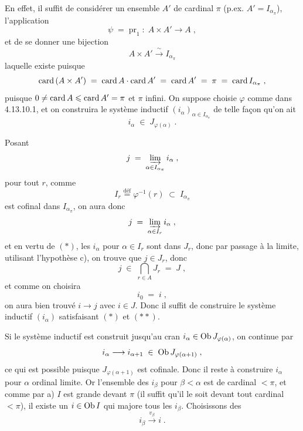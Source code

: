 En effet, il suffit de considérer un ensemble $A'$ de cardinal $\pi$ (p.ex. $A'=I_{\alpha_\pi}$), l'application
\[ \psi \; = \; \mathrm{pr}_1 \; : \; A\times A'\longrightarrow A \; , \]
et de se donner une bijection
\[ A\times A' \xrightarrow{\ \sim\ } I_{\alpha_\pi} \]
laquelle existe puisque
\[ \operatorname{card}\,(A\times A') \; = \; \operatorname{card} A\cdot\operatorname{card} A' \; = \; \operatorname{card} A' \; = \; \pi \; = \; \operatorname{card} I_{\alpha_\pi} \; , \]
puisque $0\neq\operatorname{card} A\leqslant\operatorname{card} A'=\pi$ et $\pi$ infini. On suppose choisie $\varphi$ comme dans 4.13.10.1, et on construira le système inductif $(i_\alpha)_{\alpha\in I_{\alpha_\pi}}$ de telle façon qu'on ait
\[ i_\alpha \; \in \; J_{\varphi(\alpha)} \; . \]

Posant
\[ j \; = \; \varinjlim_{\alpha\in I_{\alpha_\pi}} i_\alpha \; , \]
pour tout $r$, comme
\[ I_r \overset{\text{déf}}{=} \varphi^{-1}(r) \; \subset \; I_{\alpha_\pi} \]
est cofinal dans $I_{\alpha_\pi}$, on aura donc
\[ j \; = \; \varinjlim_{\alpha\in I_r} i_\alpha \; , \]
et en vertu de $(*)$, les $i_\alpha$ pour $\alpha\in I_r$ sont dans $J_r$, donc par passage à la limite, utilisant l'hypothèse c), on trouve que $j\in J_r$, donc
\[ j \; \in \; \bigcap_{r\in A} J_r \; = \; J \; , \]
et comme on choisira
\[ i_0 \; = \; i \; , \tag*{$(**)$} \]
on aura bien trouvé $i\longrightarrow j$ avec $i\in J$. Donc il suffit de construire le système inductif $(i_\alpha)$ satisfaisant $(*)$ et $(**)$. %

Si le système inductif est construit jusqu'au cran $i_\alpha\in\operatorname{Ob} J_{\varphi(\alpha)}$, on continue par
\[ i_\alpha \longrightarrow i_{\alpha+1} \; \in \; \operatorname{Ob} J_{\varphi(\alpha+1)} \; , \]
ce qui est possible puisque $J_{\varphi(\alpha+1)}$ est
cofinale. Donc il reste à construire $i_\alpha$ pour $\alpha$ ordinal limite. Or l'ensemble des $i_\beta$ pour $\beta<\alpha$ est de cardinal $<\pi$, et comme par a) $I$ est grande devant $\pi$ (il suffit qu'il le soit devant tout cardinal $<\pi$), il existe un $i\in\operatorname{Ob} I$ qui majore tous les $i_\beta$. Choisissons des
\[ i_\beta \xrightarrow{v_\beta} i \; . \]

